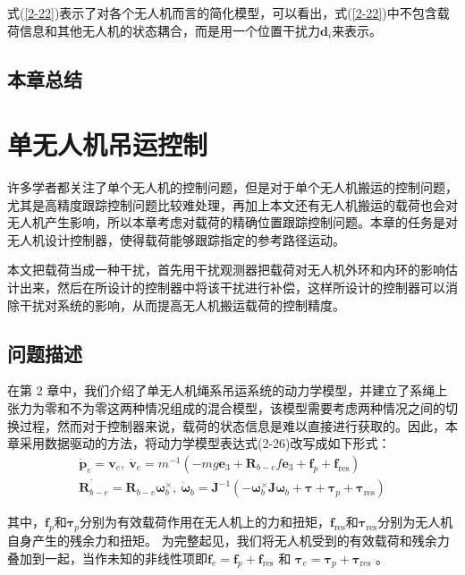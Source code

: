 \documentclass[lang=chs, degree=master, blindreview=false, winfonts=true]{yanputhesis}
\begin{document}
式(\ref{2-22})表示了对各个无人机而言的简化模型，可以看出，式(\ref{2-22})中不包含载荷信息和其他无人机的状态耦合，而是用一个位置干扰力$\boldsymbol{d}_{i}$来表示。



\section{本章总结}

\cleardoublepage

\chapter{单无人机吊运控制}

许多学者都关注了单个无人机的控制问题，但是对于单个无人机搬运的控制问题，尤其是高精度跟踪控制问题比较难处理，再加上本文还有无人机搬运的载荷也会对无人机产生影响，所以本章考虑对载荷的精确位置跟踪控制问题。本章的任务是对无人机设计控制器，使得载荷能够跟踪指定的参考路径运动。 

本文把载荷当成一种干扰，首先用干扰观测器把载荷对无人机外环和内环的影响估计出来，然后在所设计的控制器中将该干扰进行补偿，这样所设计的控制器可以消除干扰对系统的影响，从而提高无人机搬运载荷的控制精度。

\section{问题描述}
在第 2 章中，我们介绍了单无人机绳系吊运系统的动力学模型，并建立了系绳上张力为零和不为零这两种情况组成的混合模型，该模型需要考虑两种情况之间的切换过程，然而对于控制器来说，载荷的状态信息是难以直接进行获取的。因此，本章采用数据驱动的方法，将动力学模型表达式(2-26)改写成如下形式：
\begin{equation}
	\begin{aligned}
		\dot{\boldsymbol{p}}_e = \boldsymbol{v}_e, \
		\dot{\boldsymbol{v}}_e = m^{-1}\left(-mg\bm{e}_3+\boldsymbol{R}_{b-e}f\bm{e}_3+\bm{f}_p+\bm{f}_{\text{res}}\right) \\
		\dot{\bm{R}_{b-e}} = \bm{R}_{b-e} \bm{\omega}_b^{\times}, \
		\dot{\boldsymbol{\omega}}_b = \boldsymbol{J}^{-1}\left(-\bm{\omega}_b^{\times}\bm{J} \bm{\omega}_b+\boldsymbol{\tau}+ \bm{\tau}_p+ \bm{\tau}_{\text{res}}\right)
	\end{aligned}\label{3-1}
\end{equation}



其中，$\bm{f}_p$和$\bm{\tau}_p$分别为有效载荷作用在无人机上的力和扭矩，$\bm{f}_\text{res}$和$\bm{\tau}_\text{res}$分别为无人机自身产生的残余力和扭矩。
为完整起见，我们将无人机受到的有效载荷和残余力叠加到一起，当作未知的非线性项即$\bm f_e = \bm f_p+ \bm f_{\text{res}}$ 和 $\bm \tau_e = \bm \tau_p+\bm \tau_{\text{res}}$ 。
	
\end{document}
